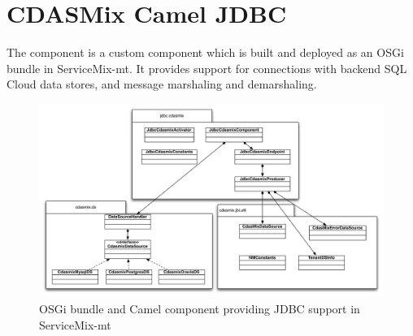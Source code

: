 \FloatBarrier

\vspace*{0.5cm}






\section{CDASMix Camel JDBC}
\label{subsec:cdasmixcameljdbc}

The  component is a custom component which is built and deployed as an \ac{OSGi} bundle in ServiceMix-mt. It provides support for connections with backend \ac{SQL} Cloud data stores, and message marshaling and demarshaling.

\begin{figure}
	\centering
		\includegraphics[clip, scale=0.6]{./gfx/cdasmix-camel-jdbc/cdasmix-camel-jdbc.pdf}
	\caption[ServiceMix-mt Camel CDASMix-JDBC Component]{OSGi bundle and Camel component providing JDBC support in ServiceMix-mt}
	\label{fig:cdasmixjdbcclassdiagram}
\end{figure}

